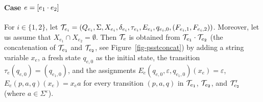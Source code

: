 \paragraph{Case $e = [e_1 \cdot e_2]$} 
For $i \in \{1,2\}$, let  
$\mathcal{T}_{e_i} = (Q_{e_i}, \Sigma, X_{e_i}, \delta_{e_i}, \tau_{e_i}, E_{e_i}, q_{e_i,0}, (F_{e_i,1}, F_{e_i,2}))$. Moreover, let us assume that $X_{e_1}\cap X_{e_2}=\emptyset$.
Then $\mathcal{T}_e$ is obtained from $\mathcal{T}_{e_1} \cdot \mathcal{T}_{e_2}$ (the concatenation of $\mathcal{T}_{e_1}$ and $\mathcal{T}_{e_2}$, see Figure~\ref{fig-psstconcat}) by adding a string variable $x_e$, a fresh state $q_{e,0}$ as the initial state, the transition $\tau_e(q_{e,0}) = (q_{e_1,0})$, and the assignments $E_e(q_{e,0}, \varepsilon, q_{e_1,0})(x_e) = \varepsilon$, $E_e(p, a, q)(x_e) = x_e a$ for every transition $(p, a, q)$ in $\mathcal{T}_{e_1}$, $\mathcal{T}_{e_2}$, and $\mathcal{T}'_{e_2}$ (where $a \in \Sigma^\varepsilon$).
